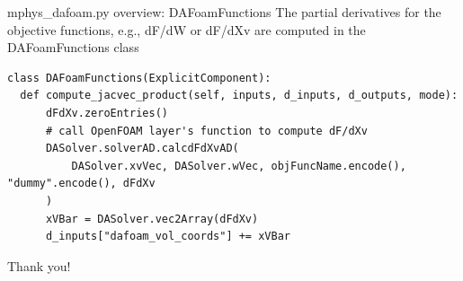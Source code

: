 \documentclass{bredelebeamer}
\begin{document}
\begin{frame}[fragile]{mphys\_dafoam.py overview: DAFoamFunctions}
The partial derivatives for the objective functions, e.g., dF/dW or dF/dXv are computed in the DAFoamFunctions class
\footnotesize
\lstset{ language=python }
\begin{lstlisting}
class DAFoamFunctions(ExplicitComponent):
  def compute_jacvec_product(self, inputs, d_inputs, d_outputs, mode):
      dFdXv.zeroEntries()
      # call OpenFOAM layer's function to compute dF/dXv
      DASolver.solverAD.calcdFdXvAD(
          DASolver.xvVec, DASolver.wVec, objFuncName.encode(), "dummy".encode(), dFdXv
      )
      xVBar = DASolver.vec2Array(dFdXv)
      d_inputs["dafoam_vol_coords"] += xVBar
\end{lstlisting}
\normalsize

\end{frame}

\begin{frame}[plain]{}
  \Huge \centering
  Thank you!
\end{frame}
\end{document}
